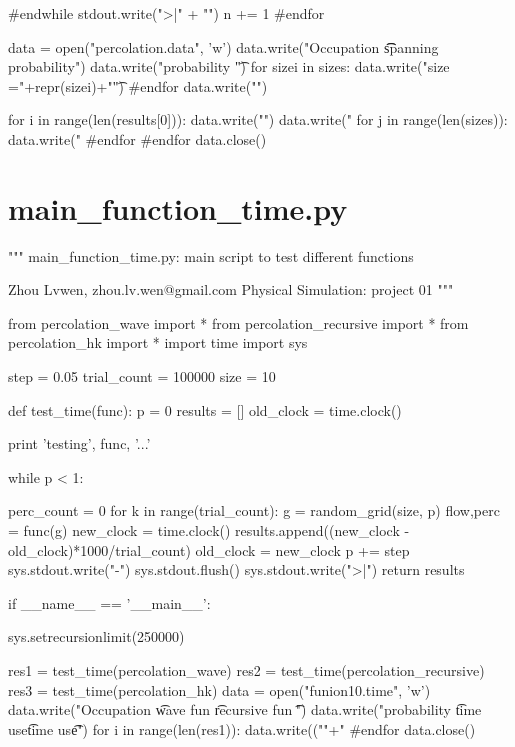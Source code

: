 \documentclass[11pt,a4paper,boxed]{caspset}
\begin{document}
\begin{subappendices}
\begin{python}
    #endwhile
    stdout.write(">|" + "\n")
    n += 1
#endfor

data = open("percolation.data", 'w')
data.write("Occupation \t\t spanning probability\n")
data.write("probability \t")
for sizei in sizes:
    data.write("size ="+repr(sizei)+"\t")
#endfor
data.write("\n")

for i in range(len(results[0])):
    data.write("\n")
    data.write("%
    for j in range(len(sizes)):
        data.write("%
    #endfor
#endfor
data.close()
\end{python}

\section{main\_function\_time.py}
\begin{python}
"""
main_function_time.py: main script to test different functions

Zhou Lvwen, zhou.lv.wen@gmail.com
Physical Simulation: project 01
"""

from percolation_wave import *
from percolation_recursive import *
from percolation_hk import *
import time
import sys

step = 0.05
trial_count = 100000
size = 10

def test_time(func):
    p = 0
    results = []
    old_clock = time.clock()

    print 'testing', func, '...'

    while p < 1:

        perc_count = 0
        for k in range(trial_count):
            g = random_grid(size, p)
            flow,perc = func(g)
        new_clock = time.clock()
        results.append((new_clock - old_clock)*1000/trial_count)
        old_clock = new_clock
        p += step
        sys.stdout.write("-")
        sys.stdout.flush()
    sys.stdout.write(">|\n")
    return results

if __name__ == '__main__':

    sys.setrecursionlimit(250000)

    res1 = test_time(percolation_wave)
    res2 = test_time(percolation_recursive)
    res3 = test_time(percolation_hk)
    data = open("funion10.time", 'w')
    data.write("Occupation \t wave fun \t recursive fun \t\n")
    data.write("probability \t time use\t time use\t\n")
    for i in range(len(res1)):
        data.write(("\n"+"%
    #endfor
    data.close()
\end{python}


\end{subappendices}
\end{document}

